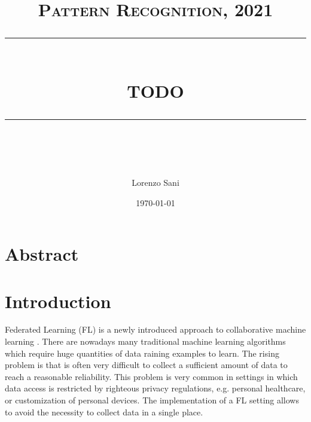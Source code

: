 \documentclass{article} %
\title{
\normalfont \normalsize 
\textsc{Pattern Recognition, 2021} \\ 
[10pt] 
\rule{\linewidth}{0.5pt} \\[6pt] 
\huge 
TODO
\rule{\linewidth}{2pt}  \\[10pt]
}
\author{Lorenzo Sani}
\date{\normalsize \today}
\begin{document}
\maketitle

\tableofcontents

\section{Abstract}

\section{Introduction}
Federated Learning (FL) is a newly introduced approach to collaborative machine 
learning \cite{9153560}.
There are nowadays many traditional machine learning algorithms which 
require huge quantities of data raining examples to learn.
The rising problem is 
that is often very difficult to collect a sufficient amount of data to reach a 
reasonable reliability.
This problem is very common in settings in which data 
access is restricted by righteous privacy regulations, e.g. personal healthcare, 
or customization of personal devices.
The implementation of a FL setting allows 
to avoid the necessity to collect data in a single place.
\end{document}
